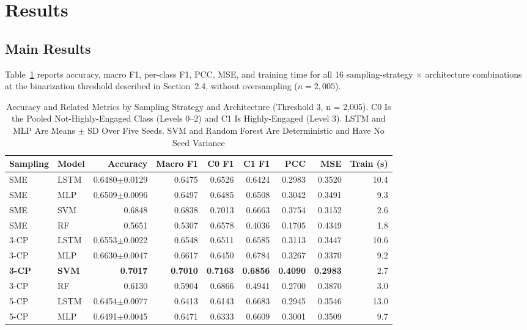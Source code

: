 \documentclass[11pt,a4paper]{article}
\begin{document}
\section{Results}

\subsection{Main Results}

Table~\ref{tab:main} reports accuracy, macro F1, per-class F1, PCC, MSE, and training time for all 16 sampling-strategy $\times$ architecture combinations at the binarization threshold described in Section~2.4, without oversampling ($n = 2{,}005$).

\begin{table}[h]
\caption{Accuracy and Related Metrics by Sampling Strategy and Architecture (Threshold 3, n = 2,005). C0 Is the Pooled Not-Highly-Engaged Class (Levels 0--2) and C1 Is Highly-Engaged (Level 3). LSTM and MLP Are Means $\pm$ SD Over Five Seeds. SVM and Random Forest Are Deterministic and Have No Seed Variance}
\label{tab:main}
\centering
\fontsize{9}{10}\selectfont
\begin{tabular}{llrrrrrrr}
\toprule
Sampling & Model & Accuracy & Macro F1 & C0 F1 & C1 F1 & PCC & MSE & Train (s) \\
\midrule
SME & LSTM & 0.6480$\pm$0.0129 & 0.6475 & 0.6526 & 0.6424 & 0.2983 & 0.3520 & 10.4 \\
SME & MLP & 0.6509$\pm$0.0096 & 0.6497 & 0.6485 & 0.6508 & 0.3042 & 0.3491 & 9.3 \\
SME & SVM & 0.6848 & 0.6838 & 0.7013 & 0.6663 & 0.3754 & 0.3152 & 2.6 \\
SME & RF & 0.5651 & 0.5307 & 0.6578 & 0.4036 & 0.1705 & 0.4349 & 1.8 \\
3-CP & LSTM & 0.6553$\pm$0.0022 & 0.6548 & 0.6511 & 0.6585 & 0.3113 & 0.3447 & 10.6 \\
3-CP & MLP & 0.6630$\pm$0.0047 & 0.6617 & 0.6450 & 0.6784 & 0.3267 & 0.3370 & 9.2 \\
\textbf{3-CP} & \textbf{SVM} & \textbf{0.7017} & \textbf{0.7010} & \textbf{0.7163} & \textbf{0.6856} & \textbf{0.4090} & \textbf{0.2983} & 2.7 \\
3-CP & RF & 0.6130 & 0.5904 & 0.6866 & 0.4941 & 0.2700 & 0.3870 & 3.0 \\
5-CP & LSTM & 0.6454$\pm$0.0077 & 0.6413 & 0.6143 & 0.6683 & 0.2945 & 0.3546 & 13.0 \\
5-CP & MLP & 0.6491$\pm$0.0045 & 0.6471 & 0.6333 & 0.6609 & 0.3001 & 0.3509 & 9.7 \\

\end{tabular}
\end{table}
\end{document}
